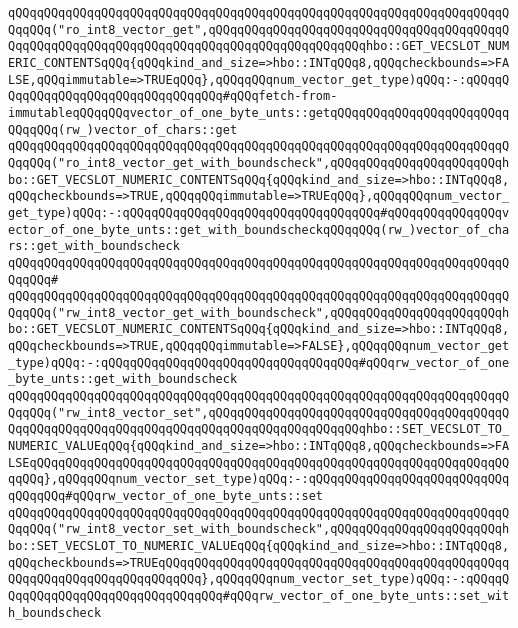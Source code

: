 \newline
\verb|qQQqqQQqqQQqqQQqqQQqqQQqqQQqqQQqqQQqqQQqqQQqqQQqqQQqqQQqqQQqqQQqqQQqqQQqqQQq("ro_int8_vector_get",qQQqqQQqqQQqqQQqqQQqqQQqqQQqqQQqqQQqqQQqqQQqqQQqqQQqqQQqqQQqqQQqqQQqqQQqqQQqqQQqqQQqqQQqqQQqhbo::GET_VECSLOT_NUMERIC_CONTENTSqQQq{qQQqkind_and_size=>hbo::INTqQQq8,qQQqcheckbounds=>FALSE,qQQqimmutable=>TRUEqQQq},qQQqqQQqnum_vector_get_type)qQQq:-:qQQqqQQqqQQqqQQqqQQqqQQqqQQqqQQqqQQq#qQQqfetch-from-immutableqQQqqQQqvector_of_one_byte_unts::getqQQqqQQqqQQqqQQqqQQqqQQqqQQqqQQq(rw_)vector_of_chars::get|\newline
\verb|qQQqqQQqqQQqqQQqqQQqqQQqqQQqqQQqqQQqqQQqqQQqqQQqqQQqqQQqqQQqqQQqqQQqqQQqqQQq("ro_int8_vector_get_with_boundscheck",qQQqqQQqqQQqqQQqqQQqqQQqhbo::GET_VECSLOT_NUMERIC_CONTENTSqQQq{qQQqkind_and_size=>hbo::INTqQQq8,qQQqcheckbounds=>TRUE,qQQqqQQqimmutable=>TRUEqQQq},qQQqqQQqnum_vector_get_type)qQQq:-:qQQqqQQqqQQqqQQqqQQqqQQqqQQqqQQqqQQq#qQQqqQQqqQQqqQQqvector_of_one_byte_unts::get_with_boundscheckqQQqqQQq(rw_)vector_of_chars::get_with_boundscheck|\newline
\verb|qQQqqQQqqQQqqQQqqQQqqQQqqQQqqQQqqQQqqQQqqQQqqQQqqQQqqQQqqQQqqQQqqQQqqQQqqQQq#|\newline
\verb|qQQqqQQqqQQqqQQqqQQqqQQqqQQqqQQqqQQqqQQqqQQqqQQqqQQqqQQqqQQqqQQqqQQqqQQqqQQq("rw_int8_vector_get_with_boundscheck",qQQqqQQqqQQqqQQqqQQqqQQqhbo::GET_VECSLOT_NUMERIC_CONTENTSqQQq{qQQqkind_and_size=>hbo::INTqQQq8,qQQqcheckbounds=>TRUE,qQQqqQQqimmutable=>FALSE},qQQqqQQqnum_vector_get_type)qQQq:-:qQQqqQQqqQQqqQQqqQQqqQQqqQQqqQQqqQQq#qQQqrw_vector_of_one_byte_unts::get_with_boundscheck|\newline
\verb|qQQqqQQqqQQqqQQqqQQqqQQqqQQqqQQqqQQqqQQqqQQqqQQqqQQqqQQqqQQqqQQqqQQqqQQqqQQq("rw_int8_vector_set",qQQqqQQqqQQqqQQqqQQqqQQqqQQqqQQqqQQqqQQqqQQqqQQqqQQqqQQqqQQqqQQqqQQqqQQqqQQqqQQqqQQqqQQqqQQqhbo::SET_VECSLOT_TO_NUMERIC_VALUEqQQq{qQQqkind_and_size=>hbo::INTqQQq8,qQQqcheckbounds=>FALSEqQQqqQQqqQQqqQQqqQQqqQQqqQQqqQQqqQQqqQQqqQQqqQQqqQQqqQQqqQQqqQQqqQQqqQQq},qQQqqQQqnum_vector_set_type)qQQq:-:qQQqqQQqqQQqqQQqqQQqqQQqqQQqqQQqqQQq#qQQqrw_vector_of_one_byte_unts::set|\newline
\verb|qQQqqQQqqQQqqQQqqQQqqQQqqQQqqQQqqQQqqQQqqQQqqQQqqQQqqQQqqQQqqQQqqQQqqQQqqQQq("rw_int8_vector_set_with_boundscheck",qQQqqQQqqQQqqQQqqQQqqQQqhbo::SET_VECSLOT_TO_NUMERIC_VALUEqQQq{qQQqkind_and_size=>hbo::INTqQQq8,qQQqcheckbounds=>TRUEqQQqqQQqqQQqqQQqqQQqqQQqqQQqqQQqqQQqqQQqqQQqqQQqqQQqqQQqqQQqqQQqqQQqqQQqqQQq},qQQqqQQqnum_vector_set_type)qQQq:-:qQQqqQQqqQQqqQQqqQQqqQQqqQQqqQQqqQQq#qQQqrw_vector_of_one_byte_unts::set_with_boundscheck|\newline
